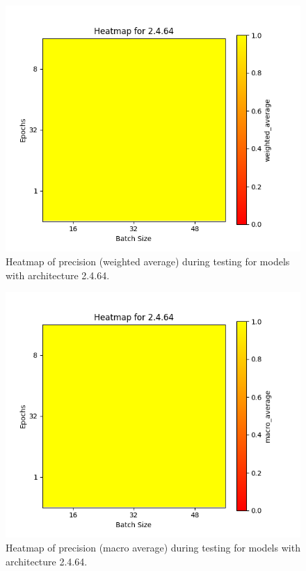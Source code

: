 \documentclass[12pt]{article}
\begin{document}
\begin{figure}[H]
\includegraphics[width=\textwidth]{heatmap_precision_weighted_average_2.4.64}
\centering
\caption{Heatmap of precision (weighted average) during testing for models with architecture 2.4.64.}
\label{fig:time-metrics}
\end{figure}

\begin{figure}[H]
\includegraphics[width=\textwidth]{heatmap_precision_macro_average_2.4.64}
\centering
\caption{Heatmap of precision (macro average) during testing for models with architecture 2.4.64.}
\label{fig:time-metrics}
\end{figure}
\end{document}
